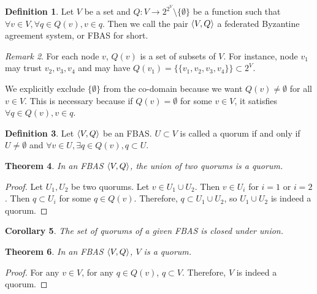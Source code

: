 \documentclass[12pt, psamsfonts]{amsart}
\newtheorem{thm}{Theorem}[section]
\newtheorem{cor}[thm]{Corollary}
\theoremstyle{definition}
\newtheorem{defn}[thm]{Definition}
\theoremstyle{remark}
\newtheorem{rem}[thm]{Remark}
\numberwithin{equation}{section}
\begin{document}
\begin{defn}
    Let $V$ be a set and $Q:V \rightarrow 2^{2^V} \setminus \{ \emptyset \}$ be a function such that $\forall v \in V, \forall q \in Q(v), v \in q$.
    Then we call the pair $\ev{V, Q}$ a federated Byzantine agreement system, or FBAS for short.
\end{defn}

\begin{rem}
    For each node $v$, $Q(v)$ is a set of subsets of $V$.
    For instance, node $v_1$ may trust $v_2, v_3, v_4$ and may have $Q(v_1) = \{ \{ v_1, v_2, v_3, v_4 \} \} \subset 2^V$.

    We explicitly exclude $\{ \emptyset \}$ from the co-domain because we want $Q(v) \ne \emptyset$ for all $v \in V$.
    This is necessary because if $Q(v) = \emptyset$ for some $v \in V$, it satisfies $\forall q \in Q(v), v \in q$.
\end{rem}

\begin{defn}
    Let $\ev{V, Q}$ be an FBAS\@.
    $U \subset V$ is called a quorum if and only if $U \ne \emptyset$ and $\forall v \in U, \exists q \in Q(v), q \subset U$.
\end{defn}

\begin{thm}\label{union_quorums}
    In an FBAS $\ev{V, Q}$, the union of two quorums is a quorum.
\end{thm}

\begin{proof}
    Let $U_1, U_2$ be two quorums.
    Let $v \in U_1 \cup U_2$.
    Then $v \in U_i$ for $i = 1$ or $i = 2$.
    Then $q \subset U_i$ for some $q \in Q(v)$.
    Therefore, $q \subset U_1 \cup U_2$, so $U_1 \cup U_2$ is indeed a quorum.
\end{proof}

\begin{cor}
    The set of quorums of a given FBAS is closed under union.
\end{cor}

\begin{thm}
    In an FBAS $\ev{V, Q}$, $V$ is a quorum.
\end{thm}

\begin{proof}
    For any $v \in V$, for any $q \in Q(v)$, $q \subset V$.
    Therefore, $V$ is indeed a quorum.
\end{proof}
\end{document}
